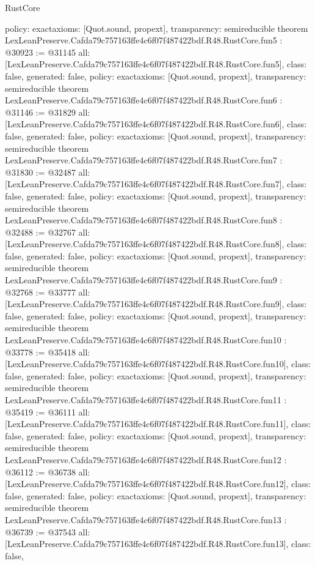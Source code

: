 \begin{lexlean}{RustCore}
\begin{coremodule}
{  policy: exact{axioms: [Quot.sound, propext]},
  transparency: semireducible
}
theorem LexLeanPreserve.Cafda79c757163ffe4c6f07f487422bdf.R48.RustCore.fun5 : @30923 := @31145 {
  all: [LexLeanPreserve.Cafda79c757163ffe4c6f07f487422bdf.R48.RustCore.fun5],
  class: false,
  generated: false,
  policy: exact{axioms: [Quot.sound, propext]},
  transparency: semireducible
}
theorem LexLeanPreserve.Cafda79c757163ffe4c6f07f487422bdf.R48.RustCore.fun6 : @31146 := @31829 {
  all: [LexLeanPreserve.Cafda79c757163ffe4c6f07f487422bdf.R48.RustCore.fun6],
  class: false,
  generated: false,
  policy: exact{axioms: [Quot.sound, propext]},
  transparency: semireducible
}
theorem LexLeanPreserve.Cafda79c757163ffe4c6f07f487422bdf.R48.RustCore.fun7 : @31830 := @32487 {
  all: [LexLeanPreserve.Cafda79c757163ffe4c6f07f487422bdf.R48.RustCore.fun7],
  class: false,
  generated: false,
  policy: exact{axioms: [Quot.sound, propext]},
  transparency: semireducible
}
theorem LexLeanPreserve.Cafda79c757163ffe4c6f07f487422bdf.R48.RustCore.fun8 : @32488 := @32767 {
  all: [LexLeanPreserve.Cafda79c757163ffe4c6f07f487422bdf.R48.RustCore.fun8],
  class: false,
  generated: false,
  policy: exact{axioms: [Quot.sound, propext]},
  transparency: semireducible
}
theorem LexLeanPreserve.Cafda79c757163ffe4c6f07f487422bdf.R48.RustCore.fun9 : @32768 := @33777 {
  all: [LexLeanPreserve.Cafda79c757163ffe4c6f07f487422bdf.R48.RustCore.fun9],
  class: false,
  generated: false,
  policy: exact{axioms: [Quot.sound, propext]},
  transparency: semireducible
}
theorem LexLeanPreserve.Cafda79c757163ffe4c6f07f487422bdf.R48.RustCore.fun10 : @33778 := @35418 {
  all: [LexLeanPreserve.Cafda79c757163ffe4c6f07f487422bdf.R48.RustCore.fun10],
  class: false,
  generated: false,
  policy: exact{axioms: [Quot.sound, propext]},
  transparency: semireducible
}
theorem LexLeanPreserve.Cafda79c757163ffe4c6f07f487422bdf.R48.RustCore.fun11 : @35419 := @36111 {
  all: [LexLeanPreserve.Cafda79c757163ffe4c6f07f487422bdf.R48.RustCore.fun11],
  class: false,
  generated: false,
  policy: exact{axioms: [Quot.sound, propext]},
  transparency: semireducible
}
theorem LexLeanPreserve.Cafda79c757163ffe4c6f07f487422bdf.R48.RustCore.fun12 : @36112 := @36738 {
  all: [LexLeanPreserve.Cafda79c757163ffe4c6f07f487422bdf.R48.RustCore.fun12],
  class: false,
  generated: false,
  policy: exact{axioms: [Quot.sound, propext]},
  transparency: semireducible
}
theorem LexLeanPreserve.Cafda79c757163ffe4c6f07f487422bdf.R48.RustCore.fun13 : @36739 := @37543 {
  all: [LexLeanPreserve.Cafda79c757163ffe4c6f07f487422bdf.R48.RustCore.fun13],
  class: false,
}
\end{coremodule}
\end{lexlean}
